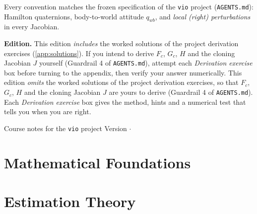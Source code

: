 \documentclass[11pt, a4paper, oneside, openany]{book}
\begin{document}
\begin{titlepage}
\begin{minipage}{0.92\textwidth}
\medskip
Every convention matches the frozen specification of the \texttt{vio} project
(\texttt{AGENTS.md}): Hamilton quaternions, body-to-world attitude $q_{wb}$, and
\emph{local (right) perturbations} in every Jacobian.
\end{minipage}

\vfill
\begin{tcolorbox}[enhanced, colback=primarylight, colframe=primary, boxrule=0.6pt, arc=1mm, width=\textwidth]
\small\textbf{Edition.}
\ifsolutions
This edition \emph{includes} the worked solutions of the project derivation exercises
(\cref{app:solutions}). If you intend to derive $F_c$, $G_c$, $H$ and the cloning Jacobian $J$
yourself (Guardrail 4 of \texttt{AGENTS.md}), attempt each \emph{Derivation exercise} box before
turning to the appendix, then verify your answer numerically.
\else
This edition \emph{omits} the worked solutions of the project derivation exercises, so that
$F_c$, $G_c$, $H$ and the cloning Jacobian $J$ are yours to derive (Guardrail 4 of
\texttt{AGENTS.md}). Each \emph{Derivation exercise} box gives the method, hints and a numerical
test that tells you when you are right.
\fi
\end{tcolorbox}

\vspace{6mm}
{\large Course notes for the \texttt{vio} project \hfill Version \guideversion{} $\cdot$ \guidedate}
\end{titlepage}
\hypersetup{pageanchor=true}



\tableofcontents

\mainmatter



\part{Mathematical Foundations}








\part{Estimation Theory}






\end{document}
